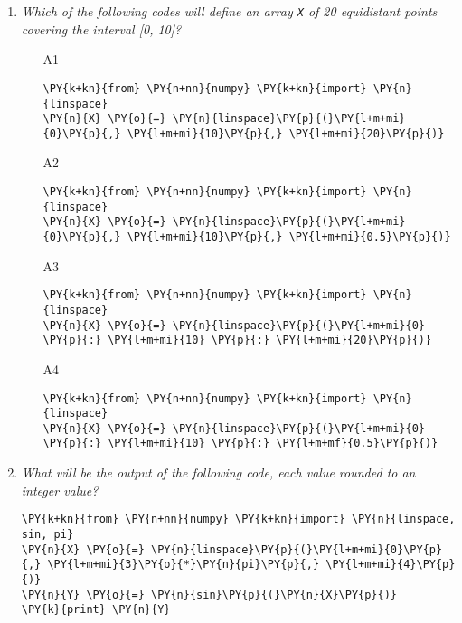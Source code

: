 \begin{enumerate}
\vspace{6mm}

\item {\em Which of the following codes will define an array {\tt X} of 20 equidistant points 
covering the interval [0, 10]?}\\

\begin{enumerate}
\item[A1]
\begin{Verbatim}[commandchars=\\\{\}]
\PY{k+kn}{from} \PY{n+nn}{numpy} \PY{k+kn}{import} \PY{n}{linspace}
\PY{n}{X} \PY{o}{=} \PY{n}{linspace}\PY{p}{(}\PY{l+m+mi}{0}\PY{p}{,} \PY{l+m+mi}{10}\PY{p}{,} \PY{l+m+mi}{20}\PY{p}{)}
\end{Verbatim}
\item[A2]
\begin{Verbatim}[commandchars=\\\{\}]
\PY{k+kn}{from} \PY{n+nn}{numpy} \PY{k+kn}{import} \PY{n}{linspace}
\PY{n}{X} \PY{o}{=} \PY{n}{linspace}\PY{p}{(}\PY{l+m+mi}{0}\PY{p}{,} \PY{l+m+mi}{10}\PY{p}{,} \PY{l+m+mi}{0.5}\PY{p}{)}
\end{Verbatim}
\item[A3]
\begin{Verbatim}[commandchars=\\\{\}]
\PY{k+kn}{from} \PY{n+nn}{numpy} \PY{k+kn}{import} \PY{n}{linspace}
\PY{n}{X} \PY{o}{=} \PY{n}{linspace}\PY{p}{(}\PY{l+m+mi}{0} \PY{p}{:} \PY{l+m+mi}{10} \PY{p}{:} \PY{l+m+mi}{20}\PY{p}{)}
\end{Verbatim}
\item[A4]
\begin{Verbatim}[commandchars=\\\{\}]
\PY{k+kn}{from} \PY{n+nn}{numpy} \PY{k+kn}{import} \PY{n}{linspace}
\PY{n}{X} \PY{o}{=} \PY{n}{linspace}\PY{p}{(}\PY{l+m+mi}{0} \PY{p}{:} \PY{l+m+mi}{10} \PY{p}{:} \PY{l+m+mf}{0.5}\PY{p}{)}
\end{Verbatim}
\end{enumerate}

\vspace{6mm}

\item {\em What will be the output of the following code, each value 
rounded to an integer value?}\\

\begin{Verbatim}[commandchars=\\\{\}]
\PY{k+kn}{from} \PY{n+nn}{numpy} \PY{k+kn}{import} \PY{n}{linspace, sin, pi}
\PY{n}{X} \PY{o}{=} \PY{n}{linspace}\PY{p}{(}\PY{l+m+mi}{0}\PY{p}{,} \PY{l+m+mi}{3}\PY{o}{*}\PY{n}{pi}\PY{p}{,} \PY{l+m+mi}{4}\PY{p}{)}
\PY{n}{Y} \PY{o}{=} \PY{n}{sin}\PY{p}{(}\PY{n}{X}\PY{p}{)}
\PY{k}{print} \PY{n}{Y}
\end{Verbatim}
\vspace{6mm}


\end{enumerate}
